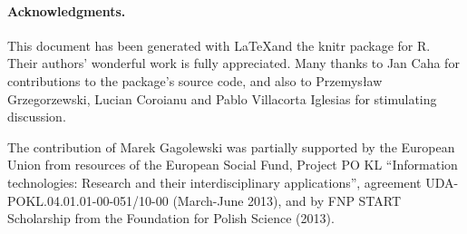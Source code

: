 \documentclass[11pt]{article}\usepackage[]{graphicx}\usepackage[]{color}
\newcommand{\package}[1]{\textsf{#1}\xspace}
\newcommand{\lang}[1]{\textsf{#1}\xspace}
\newcommand{\R}{\lang{R}}
\begin{document}



%

\paragraph{Acknowledgments.}
This document has been generated with \LaTeX and the \package{knitr}
package for \R.
Their authors' wonderful work is fully appreciated.
Many thanks to Jan Caha for contributions to the package's source code,
and also to Przemys\l{}aw Grzegorzewski, Lucian Coroianu
and Pablo Villacorta Iglesias for stimulating discussion.



The contribution of Marek Gagolewski was partially supported
by the European Union from resources of the European Social Fund, Project PO KL
``Information technologies: Research and their interdisciplinary
applications'', agreement UDA-POKL.04.01.01-00-051/10-00 (March-June 2013),
and by FNP START Scholarship from the Foundation for Polish Science (2013).



% 
% 
\end{document}
